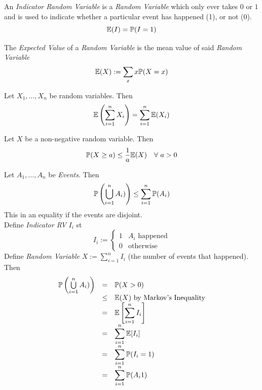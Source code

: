 \documentclass[11pt,a4paper]{article}
\begin{document}
An \textit{Indicator Random Variable} is a \textit{Random Variable} which only ever takes $0$ or $1$ and is used to indicate whether a particular event has happened (1), or not (0).
$$\mathbb{E}(I)=\mathbb{P}(I=1)$$

The \textit{Expected Value} of a \textit{Random Variable} is the mean value of said \textit{Random Variable}
$$\mathbb{E}(X):=\sum_x x\mathbb{P}(X=x)$$

Let $X_1,\dots,X_n$ be random variables. Then
$$\mathbb{E}\left(\sum_{i=1}^nX_i\right)=\sum_{i=1}^n\mathbb{E}(X_i)$$

Let $X$ be a non-negative random variable. Then
$$\prob(X\geq a)\leq\frac1a\expect(X)\quad\forall\ a>0$$

Let $A_1,\dots,A_n$ be \textit{Events}. Then
$$\mathbb{P}\left(\bigcup\limits_{i=1}^nA_i)\right)\leq\sum_{i=1}^n\mathbb{P}(A_i)$$
\nb This in an equality if the events are disjoint.\\

Define \textit{Indicator RV} $I_i$ st
$$I_i:=\begin{cases}1&A_i\text{ happened}\\0&\text{otherwise}\end{cases}$$
Define \textit{Random Variable} $X:=\sum_{i=1}^nI_i$ (the number of events that happened).\\
Then
\[\begin{array}{rcl}
\mathbb{P}\left(\bigcup\limits_{i=1}^nA_i)\right)&=&\mathbb{P}(X>0)\\
&\leq&\mathbb{E}(X)\text{ by Markov's Inequality}\\
&=&\mathbb{E}\left[\displaystyle\sum_{i=1}^nI_i\right]\\
&=&\displaystyle\sum_{i=1}^n\mathbb{E}[I_i]\\
&=&\displaystyle\sum_{i=1}^n\mathbb{P}(I_i=1)\\
&=&\displaystyle\sum_{i=1}^n\mathbb{P}(A_i1)
\end{array}\]
\proved
\end{document}
